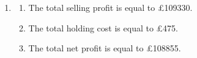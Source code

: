 \documentclass[12pt,a4paper]{article}
\makeatletter
\newtheorem*{solution}{Solution}
\theoremstyle{definition}
\renewenvironment{solution}[1][Solution] {\par\pushQED{\qed}\normalfont\topsep6\p@\@plus6\p@\relax\trivlist\item[\hskip\labelsep\bfseries#1\@addpunct{.}]\ignorespaces}{\popQED\endtrivlist\@endpefalse} \makeatother
\makeatother
\begin{document}
\begin{enumerate}
\begin{solution}
\begin{enumerate}
\begin{enumerate}
\begin{enumerate}
    
\end{enumerate}

\item The total selling profit is equal to \pounds109330.
\item The total holding cost is equal to \pounds475.
\item The total net profit is equal to \pounds108855.
\end{enumerate}
    \end{enumerate}
    \end{solution}
\end{enumerate}
\end{document}
